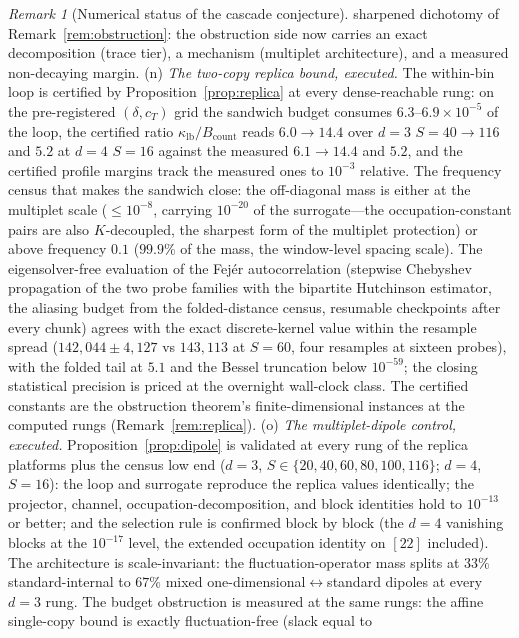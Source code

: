 \documentclass[11pt,a4paper]{article}
\theoremstyle{plain}
\theoremstyle{definition}
\theoremstyle{remark}
\newtheorem{remark}[theorem]{Remark}
\begin{document}
\begin{remark}[Numerical status of the cascade conjecture]
sharpened dichotomy of Remark~\ref{rem:obstruction}: the obstruction
side now carries an exact decomposition (trace tier), a mechanism
(multiplet architecture), and a measured non-decaying margin.
(n) \emph{The two-copy replica bound, executed.} The within-bin loop is
certified by Proposition~\ref{prop:replica} at every dense-reachable
rung: on the pre-registered $(\delta,c_T)$ grid the sandwich budget
consumes $6.3$--$6.9\times10^{-5}$ of the loop, the certified ratio
$\kappa_{\mathrm{lb}}/B_{\mathrm{count}}$ reads $6.0\to14.4$ over $d=3$
$S=40\to116$ and $5.2$ at $d=4$ $S=16$ against the measured $6.1\to14.4$
and $5.2$, and the certified profile margins track the measured ones to
$10^{-3}$ relative. The frequency census that makes the sandwich close:
the off-diagonal mass is either at the multiplet scale ($\le10^{-8}$,
carrying $10^{-20}$ of the surrogate---the occupation-constant pairs are
also $K$-decoupled, the sharpest form of the multiplet protection) or
above frequency $0.1$ ($99.9\%$ of the mass, the window-level spacing
scale). The eigensolver-free evaluation of the Fej\'er autocorrelation
(stepwise Chebyshev propagation of the two probe families with the
bipartite Hutchinson estimator, the aliasing budget from the
folded-distance census, resumable checkpoints after every chunk) agrees
with the exact discrete-kernel value within the resample spread
($142{,}044\pm4{,}127$ vs $143{,}113$ at $S=60$, four resamples at
sixteen probes), with the folded tail at $5.1$ and the Bessel truncation
below $10^{-59}$; the closing statistical precision is priced at the
overnight wall-clock class. The certified constants are the obstruction
theorem's finite-dimensional instances at the computed rungs
(Remark~\ref{rem:replica}).
(o) \emph{The multiplet-dipole control, executed.}
Proposition~\ref{prop:dipole} is validated at every rung of the replica
platforms plus the census low end ($d=3$, $S\in\{20,40,60,80,100,116\}$;
$d=4$, $S=16$): the loop and surrogate reproduce the replica values
identically; the projector, channel, occupation-decomposition, and block
identities hold to $10^{-13}$ or better; and the selection rule is
confirmed block by block (the $d=4$ vanishing blocks at the
$10^{-17}$ level, the extended occupation identity on $[22]$ included).
The architecture is scale-invariant: the fluctuation-operator mass splits
at $33\%$ standard-internal to $67\%$ mixed
one-dimensional$\leftrightarrow$standard dipoles at every $d=3$ rung.
The budget obstruction is measured at the same rungs: the affine
single-copy bound is exactly fluctuation-free (slack equal to

\end{remark}
\end{document}
